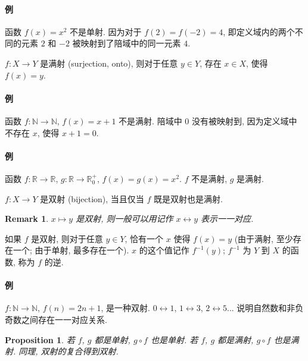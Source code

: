 \documentclass[UTF8]{ctexart}
\theoremstyle{mystyle}
\newtheorem{proposition}{Proposition}[section]
\theoremstyle{myremark}
\newtheorem*{remark}{Remark}
\theoremstyle{plain}
\newcommand{\R}{\mathbb R}
\newcommand{\N}{\mathbb N}
\begin{document}
\paragraph{例}
函数 $ f(x) = x^2 $ 不是单射. 因为对于 $ f(2) = f(-2) = 4 $, 即定义域内的两个不同的元素 $ 2 $ 和 $ -2 $ 被映射到了陪域中的同一元素 $ 4 $.

\begin{definition}[\text{满射/映上}]
    $ f \colon X \to Y $ 是满射 (surjection, onto), 则对于任意 $ y \in Y $, 存在 $ x \in X $, 使得 $ f(x) = y $.
\end{definition}

\paragraph{例}
函数 $ f \colon \N \to \N $, $ f(x) = x + 1 $ 不是满射. 陪域中 $ 0 $ 没有被映射到, 因为定义域中不存在 $ x $, 使得 $ x + 1 = 0 $.

\paragraph{例}
函数 $ f \colon \R \to \R $, $ g: \R \to \R_0^+ $, $ f(x) = g(x) = x^2 $. $ f $ 不是满射, $ g $ 是满射.


\begin{definition}
    $ f \colon X \to Y $ 是双射 (bijection), 当且仅当 $ f $ 既是双射也是满射.
\end{definition}

\begin{remark}
    $ x \mapsto y $ 是双射, 则一般可以用记作 $ x \leftrightarrow y $ 表示一一对应.
\end{remark}

如果 $ f $ 是双射, 则对于任意 $ y \in Y $, 恰有一个 $ x $ 使得 $ f(x) = y $ (由于满射, 至少存在一个; 由于单射, 最多存在一个). $ x $ 的这个值记作 $ f^{-1}(y) $; $ f^{-1} $ 为 $ Y $ 到 $ X $ 的函数, 称为 $ f $ 的逆.

\paragraph{例}
$ f \colon \N \to \N $, $ f(n) = 2 n + 1 $, 是一种双射. $ 0 \leftrightarrow 1 $, $ 1 \leftrightarrow 3 $, $ 2 \leftrightarrow 5 $... 说明自然数和非负奇数之间存在一一对应关系.

\begin{proposition} \label{c}
    若 $ f $, $ g $ 都是单射, $ g \circ f $ 也是单射. 若 $ f $, $ g $ 都是满射, $ g \circ f $ 也是满射. 同理, 双射的复合得到双射.
\end{proposition}
\end{document}
